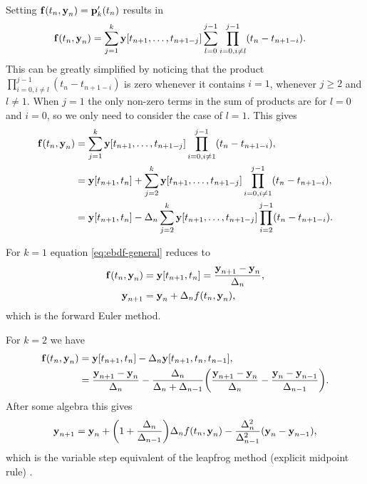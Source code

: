Setting ${\boldsymbol{\mathrm{f}}{\left( t_n, \boldsymbol{\mathrm{y}}_n \right)}} = {\boldsymbol{\mathrm{p}}}_k'(t_n)$ results in
\begin{equation}
  \begin{aligned}
    {\boldsymbol{\mathrm{f}}{\left( t_n, \boldsymbol{\mathrm{y}}_n \right)}} &= \sum_{j=1}^k \boldsymbol{\mathrm{y}}[t_{n+1}, \ldots, t_{n+1-j}] \sum_{l=0}^{j-1} \prod_{i=0, i \neq l}^{j-1} (t_n - t_{n+1-i}).
  \end{aligned}
\end{equation}
This can be greatly simplified by noticing that the product $ \prod_{i=0, i \neq l}^{j-1} (t_n - t_{n+1-i})$ is zero whenever it contains $i=1$, \ie whenever $j \geq 2$ and $l \neq 1$.
When $j=1$ the only non-zero terms in the sum of products are for $l=0$ and $i=0$, so we only need to consider the case of $l=1$.
This gives
\begin{equation}
  \begin{aligned}
    {\boldsymbol{\mathrm{f}}{\left( t_n, \boldsymbol{\mathrm{y}}_n \right)}} &= \sum_{j=1}^k \boldsymbol{\mathrm{y}}[t_{n+1}, \ldots, t_{n+1-j}] \prod_{i=0, i \neq 1}^{j-1} (t_n - t_{n+1-i}), \\
    &= \boldsymbol{\mathrm{y}}[t_{n+1}, t_n] + \sum_{j=2}^k \boldsymbol{\mathrm{y}}[t_{n+1}, \ldots, t_{n+1-j}] \prod_{i=0, i \neq 1}^{j-1} (t_n - t_{n+1-i}), \\
    &= \boldsymbol{\mathrm{y}}[t_{n+1}, t_n] -\Delta_{n} \sum_{j=2}^k \boldsymbol{\mathrm{y}}[t_{n+1}, \ldots, t_{n+1-j}] \prod_{i=2}^{j-1} (t_n - t_{n+1-i}). \\
  \end{aligned}
  \label{eq:ebdf-general}
\end{equation}

For $k=1$ equation \cref{eq:ebdf-general} reduces to
\begin{equation}
  \begin{aligned}
    {\boldsymbol{\mathrm{f}}}(t_n, \boldsymbol{\mathrm{y}}_n) &= \boldsymbol{\mathrm{y}}[t_{n+1}, t_n] = \frac{\boldsymbol{\mathrm{y}}_{n+1} - \boldsymbol{\mathrm{y}}_n}{\Delta_{n}}, \\
    \boldsymbol{\mathrm{y}}_{n+1} &= \boldsymbol{\mathrm{y}}_n + \Delta_{n} f(t_n, \boldsymbol{\mathrm{y}}_n), \\
  \end{aligned}
\end{equation}
which is the forward Euler method.

For $k=2$ we have
\begin{equation}
  \begin{aligned}
    {\boldsymbol{\mathrm{f}}}(t_n, \boldsymbol{\mathrm{y}}_n) &= \boldsymbol{\mathrm{y}}[t_{n+1}, t_n] - \Delta_{n} \boldsymbol{\mathrm{y}}[t_{n+1}, t_n, t_{n-1}] , \\
    &=  \frac{\boldsymbol{\mathrm{y}}_{n+1} - \boldsymbol{\mathrm{y}}_n}{\Delta_{n}}
    - \frac{\Delta_{n}}{\Delta_{n} + \Delta_{n-1}} {\left(  \frac{\boldsymbol{\mathrm{y}}_{n+1} - \boldsymbol{\mathrm{y}}_n}{\Delta_{n}} - \frac{\boldsymbol{\mathrm{y}}_n - \boldsymbol{\mathrm{y}}_{n-1}}{\Delta_{n-1}} \right)}.
  \end{aligned}
\end{equation}
After some algebra this gives
\begin{equation}
  \label{eq:emr-derivation-rearranged}
  \boldsymbol{\mathrm{y}}_{n+1} = \boldsymbol{\mathrm{y}}_n + {\left( 1 + \frac{\Delta_{n}}{\Delta_{n-1}} \right)}\Delta_{n} f(t_n, \boldsymbol{\mathrm{y}}_n)
    - \frac{\Delta_{n}^2}{\Delta_{n-1}^2}(\boldsymbol{\mathrm{y}}_n - \boldsymbol{\mathrm{y}}_{n-1}),
\end{equation}
which is the variable step equivalent of the leapfrog method (explicit midpoint rule) \cite[715]{GreshoSani}.

